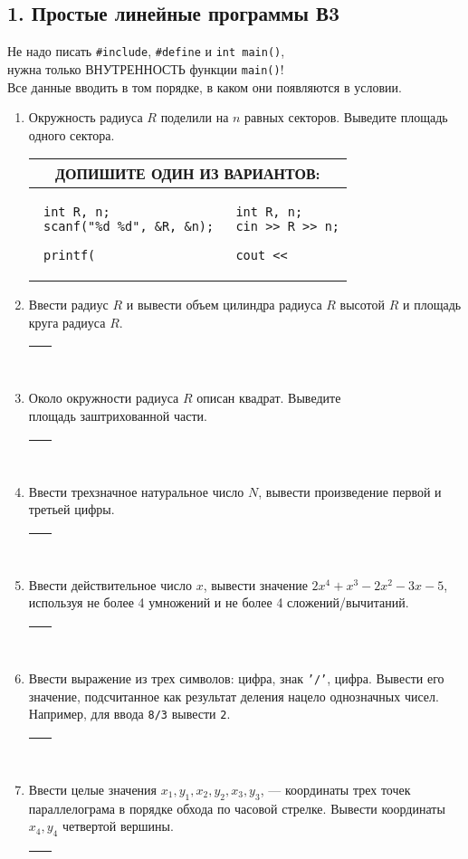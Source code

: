 \documentclass{article}
\newcommand{\answerbox}[1][1.9cm]{\par\begin{tabular}{|p{.92\textwidth}|}
 \hline
 ~\linebreak\vskip#1\mbox{}
 \\
 \hline
\end{tabular}}
\begin{document}
\pagestyle{empty}
\abovedisplayskip=0pt

\subsection*{1. Простые линейные программы \hfill В3}

Не надо писать \texttt{\#include}, \texttt{\#define} и \texttt{int main()}, \\нужна только ВНУТРЕННОСТЬ функции \texttt{main()}! \\Все данные вводить в том порядке, в каком они появляются в условии.

\begin{enumerate}[left=0pt .. \parindent]
\item
Окружность радиуса $R$ поделили на $n$ равных секторов. Выведите площадь одного сектора.
\\
\setlength\partopsep{-\topsep}
\begin{tabular}{|p{}@{}|@{}p{}|}
\hline
\multicolumn{2}{|c|}{ДОПИШИТЕ ОДИН ИЗ ВАРИАНТОВ:}
\\
\hline
 \begin{verbatim}
 int R, n;
 scanf("%d %d", &R, &n);
 
 printf( 
 \end{verbatim}
&
 \begin{verbatim}
 int R, n;
 cin >> R >> n;

 cout << 
 \end{verbatim}
\\
\hline
\end{tabular}
\item
Ввести радиус $R$ и вывести объем цилиндра радиуса $R$ высотой $R$ и площадь круга радиуса $R$.
\answerbox
\item
Около окружности радиуса $R$ описан квадрат. Выведите \hfill{}\\
площадь заштрихованной части.\\[1mm]
\answerbox
\item
Ввести трехзначное натуральное число $N$, вывести произведение первой и третьей цифры.
\answerbox
\item
Ввести действительное число $x$, вывести значение $2x^4+x^3-2x^2-3x-5$, используя не более 4 умножений и не более 4 сложений/вычитаний.
\answerbox
\item
Ввести выражение из трех символов: цифра, знак \texttt{'/'}, цифра. Вывести его значение, подсчитанное как результат деления нацело однозначных чисел. Например, для ввода \texttt{8/3} вывести \texttt{2}.
\answerbox
\item
Ввести целые значения $x_1, y_1, x_2, y_2, x_3, y_3$, --- координаты трех точек параллелограма в порядке обхода по часовой стрелке. Вывести координаты $x_4, y_4$ четвертой вершины. 
\answerbox[7.4cm]
\end{enumerate}
\end{document}
